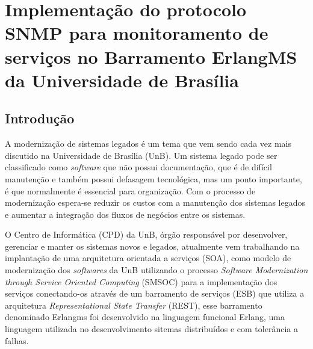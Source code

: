 \documentclass[qualidr]{eesc}
\begin{document}





\sumario

\mainmatter

\chapter[Implementação do protocolo SNMP para monitoramento de serviços no Barramento ErlangMS da Universidade de Brasília]{Implementação do protocolo SNMP para monitoramento de serviços no Barramento ErlangMS da Universidade de Brasília}

\section[Introdução]{Introdução}

A modernização de sistemas legados é um tema que vem sendo cada vez mais discutido na Universidade de Brasília (UnB). Um sistema legado pode ser classificado como \textit{software} que não possui documentação, que é de difícil manutenção e também possui defasagem tecnológica, mas um ponto importante, é que normalmente é essencial para organização. Com o processo de modernização espera-se reduzir os custos com a manutenção dos sistemas legados e aumentar a integração dos fluxos de negócios entre os sistemas\cite{Agilar}.

O Centro de Informática (CPD) da UnB, órgão responsável por desenvolver, gerenciar e manter os sistemas novos e legados, atualmente vem trabalhando na implantação de uma arquitetura orientada a serviços (SOA), como modelo de modernização dos \textit{softwares} da UnB utilizando o processo  \textit{Software Modernization through Service Oriented Computing} (SMSOC) para a implementação dos serviços conectando-os  através de um barramento de serviços (ESB) que utiliza a arquitetura \textit{Representational State Transfer} (REST), esse barramento denominado Erlangms foi desenvolvido na linguagem funcional Erlang, uma linguagem utilizada no desenvolvimento sitemas distribuídos e com tolerância a falhas.
\end{document}
